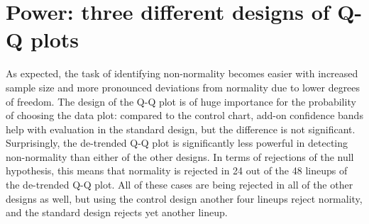 \documentclass{article}\usepackage[]{graphicx}\usepackage[]{color}
\begin{document}
\section{Power: three different designs of Q-Q plots}\label{sec:power1}

%
As expected, the task of identifying non-normality becomes easier with increased sample size and more pronounced deviations from normality due to lower degrees of freedom. The  design of the Q-Q plot is of huge importance for the probability of choosing the data plot: compared to the control chart, add-on confidence bands help with evaluation in the standard design, but the difference is not significant.  Surprisingly, the de-trended Q-Q plot is significantly less powerful in detecting non-normality than either of the other designs. 
In terms of rejections of the null hypothesis, this means that normality is rejected in 24 out of the 48 lineups of the de-trended Q-Q plot. All of these cases are being rejected in all of the other designs as well, but using the control design another four lineups reject normality, and the standard design rejects yet another lineup.
\end{document}
